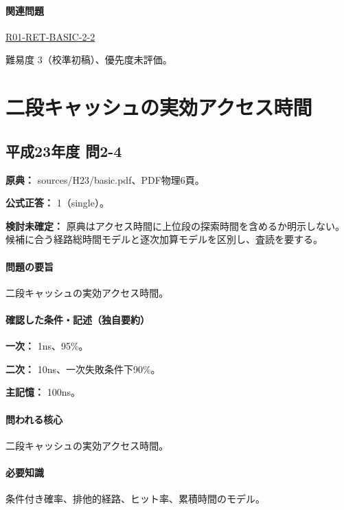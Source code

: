 \paragraph{関連問題} \hyperref[q:r01-ret-basic-2-2]{R01-RET-BASIC-2-2}

\par 難易度 3（校準初稿）、優先度未評価。

\section{二段キャッシュの実効アクセス時間}

\subsection{平成23年度 問2-4}
\label{q:h23-reg-basic-2-4}

\noindent\textbf{原典：} sources/H23/basic.pdf、PDF物理6頁。

\textbf{公式正答：} 1（single）。

\par\textbf{検討未確定：} 原典はアクセス時間に上位段の探索時間を含めるか明示しない。候補に合う経路総時間モデルと逐次加算モデルを区別し、査読を要する。

\paragraph{問題の要旨} 二段キャッシュの実効アクセス時間。

\paragraph{確認した条件・記述（独自要約）}\mbox{}\par

\noindent\textbf{一次：} 1ns、95\%。\par

\noindent\textbf{二次：} 10ns、一次失敗条件下90\%。\par

\noindent\textbf{主記憶：} 100ns。\par

\paragraph{問われる核心} 二段キャッシュの実効アクセス時間。

\paragraph{必要知識} 条件付き確率、排他的経路、ヒット率、累積時間のモデル。

